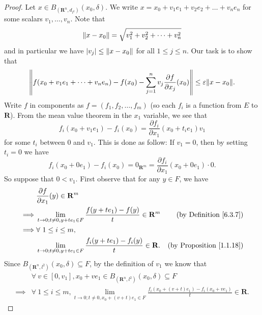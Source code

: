 \begin{proof}
    Let \(x \in B_{(\mathbf{R}^n, d_{l^2})}(x_0, \delta)\).
    We write \(x = x_0 + v_1 e_1 + v_2 e_2 + \dots + v_n e_n\) for some scalars \(v_1, \dots, v_n\).
    Note that
    \[
        \norm*{x - x_0} = \sqrt{v_1^2 + v_2^2 + \dots + v_n^2}
    \]
    and in particular we have \(\abs*{v_j} \leq \norm*{x - x_0}\) for all \(1 \leq j \leq n\).
    Our task is to show that
    \[
        \norm*{f(x_0 + v_1 e_1 + \dots + v_n e_n) - f(x_0) - \sum_{j = 1}^n v_j \frac{\partial f}{\partial x_j}(x_0)} \leq \varepsilon \norm*{x - x_0}.
    \]
    Write \(f\) in components as \(f = (f_1 , f_2, \dots, f_m)\)
    (so each \(f_i\) is a function from \(E\) to \(\mathbf{R}\)).
    From the mean value theorem in the \(x_1\) variable, we see that
    \[
        f_i(x_0 + v_1 e_1) - f_i(x_0) = \frac{\partial f_i}{\partial x_1}(x_0 + t_i e_1) v_1
    \]
    for some \(t_i\) between \(0\) and \(v_1\).
    This is done as follow:
    If \(v_1 = 0\), then by setting \(t_i = 0\) we have
    \[
        f_i(x_0 + 0 e_1) - f_i(x_0) = 0_{\mathbf{R}^m} = \frac{\partial f_i}{\partial x_1}(x_0 + 0 e_1) \cdot 0.
    \]
    So suppose that \(0 < v_1\).
    First observe that for any \(y \in F\), we have
    \begin{align*}
                 & \frac{\partial f}{\partial x_1}(y) \in \mathbf{R}^m                                                                                 \\
        \implies & \lim_{t \to 0 ; t \neq 0, y + t e_1 \in F} \frac{f(y + t e_1) - f(y)}{t} \in \mathbf{R}^m    & \text{(by Definition \ref{6.3.7})}   \\
        \implies & \forall\ 1 \leq i \leq m,                                                                                                           \\
                 & \lim_{t \to 0 ; t \neq 0, y + t e_1 \in F} \frac{f_i(y + t e_1) - f_i(y)}{t} \in \mathbf{R}. & \text{(by Proposition \ref{1.1.18})}
    \end{align*}
    Since \(B_{(\mathbf{R}^n, l^2)}(x_0, \delta) \subseteq F\), by the definition of \(v_1\) we know that
    \begin{align*}
                 & \forall\ v \in [0, v_1], x_0 + v e_1 \in B_{(\mathbf{R}^n, l^2)}(x_0, \delta) \subseteq F                                                        \\
        \implies & \forall\ 1 \leq i \leq m, \lim_{t \to 0 ; t \neq 0, x_0 + (v + t) e_1 \in F} \frac{f_i(x_0 + (v + t) e_1) - f_i(x_0 + v e_1)}{t} \in \mathbf{R}.
    \end{align*}

\end{proof}
